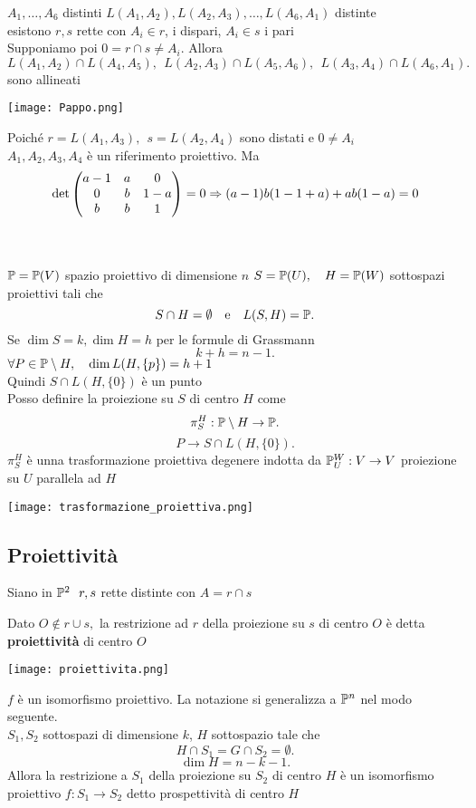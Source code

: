 \documentclass[12px]{article}
\begin{document}
	\begin{teo}[Pappo]
	$A_1,\ldots,A_6$ distinti $L(A_1,A_2),L(A_2,A_3),\ldots,L(A_6,A_1)$ distinte\\
	esistono $r,s$ rette con $A_i\in r$, i dispari, $A_i\in s$ i pari\\
	Supponiamo poi $0=r\cap s\neq A_i.$ Allora 
	\[
	L(A_1,A_2)\cap L(A_4,A_5), \ \ L(A_2,A_3)\cap L(A_5,A_6),\ \ L(A_3,A_4)\cap L(A_6,A_1)
	.\] 
	sono allineati
\end{teo}
\begin{center}
	\texttt{[image: Pappo.png]}
\end{center}
\begin{dimo}
	Poiché $r = L(A_1,A_3),\ \ s=L(A_2,A_4)$ sono distati e $0\neq A_i$\\
	$A_1,A_2,A_3,A_4$ è un riferimento proiettivo. Ma
	\[
		\det\begin{pmatrix}a-1 & a & 0 \\ 0 &b &1 - a\\ b & b & 1\end{pmatrix} = 0 \Rightarrow  (a-1)b(1-1+a)+ab(1-a)=0
	\] 

\end{dimo}

\ \\ \hline \ \\
 $\mathbb{P}=\mathbb{P}(V)$ spazio proiettivo di dimensione $n$ $S = \mathbb{P} (U),\ \ \ H = \mathbb{P}(W)$ sottospazi proiettivi tali che 
 \[
  S\cap H = \emptyset \ \ \text{ e} \ \ \ L(S,H)=\mathbb{P}
 .\] 
 Se $\dim S = k, \dim H = h$ per le formule di Grassmann
  \[
 k + h = n-1
 .\] 
$\forall P\in \mathbb{P}\setminus H, \ \ \ \dim L(H,\{p\})=h+1$\\
Quindi $S\cap L(H,\{0\}) $ è un punto\\
Posso definire la proiezione su  $S$ di centro $H$ come
\[
 \pi^H_S: \mathbb{P}\setminus H \rightarrow \mathbb{P}
.\] 
\[
	P \rightarrow S\cap L(H,\{0\})
.\] 
$\pi^H_S$ è unna trasformazione proiettiva degenere indotta da $\mathbb{P}^W_U :V \rightarrow V$ proiezione su $U$ parallela ad $H$\\
\begin{center}
	\texttt{[image: trasformazione\_proiettiva.png]}
\end{center}
 \subsection{Proiettività}
 Siano in $\mathbb{P}^2\ \ r,s$ rette distinte con $A = r\cap s$
  \begin{defi}
 	Dato $O\not\in r\cup s,$ la restrizione ad $r$ della proiezione su $s$ di centro $O$ è detta  \textbf{proiettività} di centro $O$
\end{defi}
\begin{center}
	\texttt{[image: proiettivita.png]}
\end{center}
$f$ è un isomorfismo proiettivo. La notazione si generalizza a $\mathbb{P}^n$ nel modo seguente.\\
$S_1,S_2$ sottospazi di dimensione $k$, $H$ sottospazio tale che \[
H\cap S_1 = G\cap S_2 = \emptyset
.\] 
\[
\dim H = n  - k - 1
.\] Allora la restrizione a $S_1$ della proiezione su $S_2$ di centro $H$ è un isomorfismo proiettivo $f: S_1 \rightarrow S_2 $ detto prospettività di centro $H$
\newpage
\end{document}
